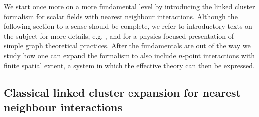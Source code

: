 We start once more on a more fundamental level by introducing the linked cluster
formalism for scalar fields with nearest neighbour interactions. Although the
following section to a sense should be complete, we refer to introductory texts
on the subject for more details, e.g. \citep{Wortis:1980zb,Reisz:1995ag}, and
\citep{Domb:1980zb,Martin:1980zb} for a physics focused presentation of simple
graph theoretical practices. After the fundamentals are out of the way we study
how one can expand the formalism to also include $n$-point interactions with
finite spatial extent, a system in which the effective theory can then be
expressed.

\subsection{Classical linked cluster expansion for nearest neighbour interactions}
\label{sec:classical_lce_nn}


